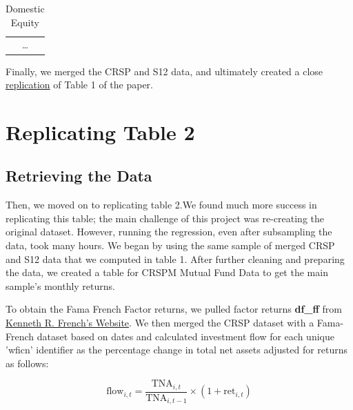 \documentclass{article}
\begin{document}
\begin{table}

\centering
\captionsetup{labelformat=empty, font=bf}
\caption{Domestic Equity}


\vspace{5pt} %

\begin{tabular}{c} %

\multicolumn{1}{c}{\ldots} \\ %
\end{tabular}

\end{table} 
 
Finally, we merged the CRSP and S12 data, and ultimately created
a close \hyperref[tab:table_complete]{replication} of Table 1 of the paper.



\section{Replicating Table 2}

\subsection{Retrieving the Data}
Then, we moved on to replicating table 2.We found much more success in replicating this table; the main 
challenge of this project was re-creating the original dataset. However, running the regression, even after subsampling
the data, took many hours. We began by using the same sample of 
merged CRSP and S12 data that we computed in table 1. After further cleaning and preparing the data, 
we created a table for CRSPM Mutual Fund Data to get the main sample's monthly returns. 

% 

To obtain the Fama French Factor returns, we pulled factor returns \textbf{df\_ff} from 
\href{http://mba.tuck.dartmouth.edu/pages/faculty/ken.french/index.html}{Kenneth 
R. French's Website}. We then merged the CRSP dataset with a Fama-French dataset based on
dates and calculated investment flow for each unique 'wficn' identifier as the 
percentage change in total net assets adjusted for returns as follows: 

$$
\text{flow}_{i,t} = \frac{\text{TNA}_{i,t}}{\text{TNA}_{i,t-1}} \times (1 + \text{ret}_{i,t})
$$
\end{document}
